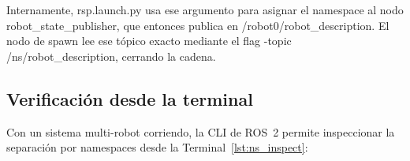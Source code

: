 Internamente, rsp.launch.py usa ese argumento para asignar el namespace al nodo robot\_state\_publisher, que entonces publica en /robot0/robot\_description. El nodo de spawn lee ese tópico exacto mediante el flag -topic /{ns}/robot\_description, cerrando la cadena.

\subsection{Verificación desde la terminal}

Con un sistema multi-robot corriendo, la CLI de ROS~2 permite inspeccionar la separación por namespaces desde la Terminal~\ref{lst:ns_inspect}:


